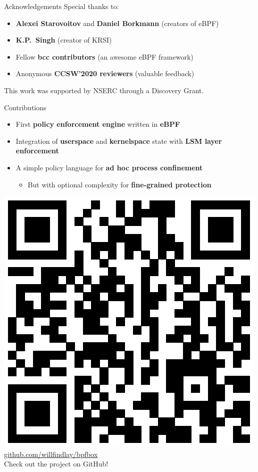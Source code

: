 \documentclass[12pt, dvipsnames, aspectratio=169]{beamer}
\begin{document}
\begin{frame}[c]{Acknowledgements}
Special thanks to:
\begin{itemize}
    \item \textbf{Alexei Starovoitov} and \textbf{Daniel Borkmann} (creators of eBPF)
    \item \textbf{K.P.~Singh} (creator of KRSI)
    \item Fellow \textbf{bcc contributors} (an awesome eBPF framework)
    \item Anonymous \textbf{CCSW'2020 reviewers} (valuable feedback)
\end{itemize}
\vfill
This work was supported by NSERC through a Discovery Grant.
\end{frame}

\begin{frame}[c]{Contributions}
\begin{itemize}
    \item First \textbf{policy enforcement engine} written in \textbf{eBPF}
    \vfill
    \item Integration of \textbf{userspace} and \textbf{kernelspace} state with \textbf{LSM layer enforcement}
    \vfill
    \item A simple policy language for \textbf{ad hoc process confinement}
    \begin{itemize}
        \item But with optional complexity for \textbf{fine-grained protection}
    \end{itemize}
\end{itemize}
\begin{center}
    \includegraphics[height=0.4\textheight]{figs/bpfbox-qrcode.eps}\\
    \href{https://github.com/willfindlay/bpfbox}{\ttfamily github.com/willfindlay/bpfbox}\\
    Check out the project on GitHub!
\end{center}
\end{frame}
\end{document}
